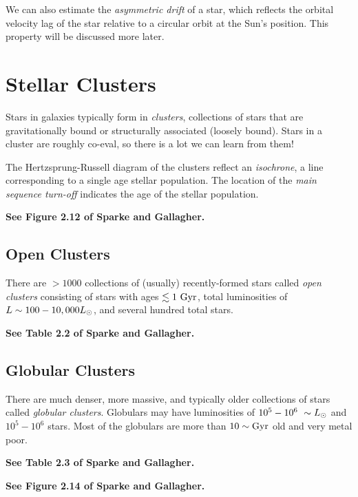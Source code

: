 \documentclass[]{article}
\begin{document}
We can also estimate the {\it asymmetric drift} of a star, which
reflects the orbital velocity lag of the star relative to a 
circular orbit at the Sun's position. This property will be
discussed more later.

\section{Stellar Clusters}

Stars in galaxies typically form in {\it clusters}, collections
of stars that are gravitationally bound or structurally associated
(loosely bound).
Stars in a cluster are roughly co-eval, so there is a lot we
can learn from them!

The Hertzsprung-Russell diagram of the clusters reflect an
{\it isochrone}, a line corresponding to a single age stellar
population. The location of the {\it main sequence turn-off}
indicates the age of the stellar population.

{\bf See Figure 2.12 of Sparke and Gallagher.}

\subsection{Open Clusters}

There are $>1000$ collections of (usually) recently-formed stars
called {\it open clusters} consisting of stars with
ages $\lesssim1~\mathrm{Gyr}$, total luminosities of 
$L\sim100-10,000L_{\odot}$, and several hundred total stars.

{\bf See Table 2.2 of Sparke and Gallagher.}


\subsection{Globular Clusters}

There are much denser, more massive, and typically older
collections of stars called {\it globular clusters}.
Globulars may have luminosities of $10^5-10^6~\sim L_{\odot}$ 
and $10^{5}-10^6$ stars. Most of the globulars are more
than $10\sim\mathrm{Gyr}$ old and very metal poor.

{\bf See Table 2.3 of Sparke and Gallagher.}

{\bf See Figure 2.14 of Sparke and Gallagher.}
\end{document}
